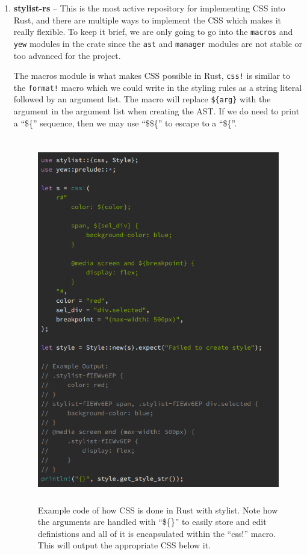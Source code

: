 \documentclass[
    paper=letter,
    parskip=half,
    fontsize=12pt,
    titlepage=firstiscover,
    toc=bibliography,
    numbers=endperiod
]{scrartcl}
\begin{document}
\begin{enumerate}
    \item
          \textbf{stylist-rs} -- This is the most active repository for
          implementing CSS into Rust, and there are multiple ways to implement
          the CSS which makes it really flexible. To keep it brief, we are
          only going to go into the \texttt{macros} and \texttt{yew} modules
          in the crate since the \texttt{ast} and \texttt{manager} modules are
          not stable or too advanced for the project.

          The macros module \cite{stylist-macros} is what makes CSS possible in
          Rust, \texttt{css!} is similar to the \texttt{format!} macro which we
          could write in the styling rules as a string literal followed by an
          argument list. The macro will replace \texttt{\$\{arg\}} with the
          argument in the argument list when creating the AST. If we do need to
          print a ``\$\{'' sequence, then we may use ``\$\$\{'' to escape to a
          ``\$\{''.

          \begin{figure}[H]
              \includegraphics[height=16cm]{stylist-rust-example}
              \caption{Example code of how CSS is done in Rust with stylist. Note how the arguments are handled with ``\$\{\}'' to easily store and edit definistions and all of it is encapsulated within the ``css!'' macro. This will output the appropriate CSS below it.}
          \end{figure}


\end{enumerate}
\end{document}
